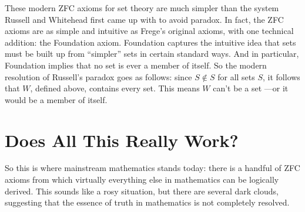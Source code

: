 These modern ZFC axioms for set theory are much simpler than the system
Russell and Whitehead first came up with to avoid paradox.  In fact, the
ZFC axioms are as simple and intuitive as Frege's original axioms, with
one technical addition: the Foundation axiom.  Foundation captures the
intuitive idea that sets must be built up from ``simpler'' sets in certain
standard ways.  And in particular, Foundation implies that no set is ever
a member of itself.  So the modern resolution of Russell's paradox goes as
follows: since $S \not \in S$ for all sets $S$, it follows that $W$,
defined above, contains every set.  This means $W$ can't be a set ---or it
would be a member of itself.

\section{Does All This Really Work?}\label{setsreallywork}

So this is where mainstream mathematics stands today: there is a handful
of ZFC axioms from which virtually everything else in mathematics can be
logically derived.  This sounds like a rosy situation, but there are
several dark clouds, suggesting that the essence of truth in mathematics
is not completely resolved.

